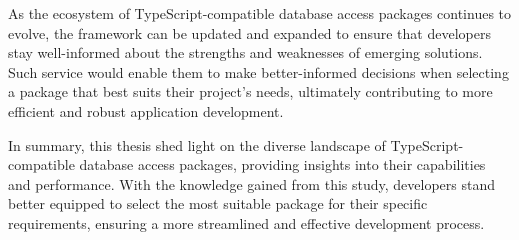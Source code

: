 As the ecosystem of TypeScript-compatible database access packages continues to
evolve, the framework can be updated and expanded to ensure that developers stay
well-informed about the strengths and weaknesses of emerging solutions. Such
service would enable them to make better-informed decisions when selecting a
package that best suits their project's needs, ultimately contributing to more
efficient and robust application development.

In summary, this thesis shed light on the diverse landscape of
TypeScript-compatible database access packages, providing insights into their
capabilities and performance. With the knowledge gained from this study,
developers stand better equipped to select the most suitable package for their
specific requirements, ensuring a more streamlined and effective development
process.

